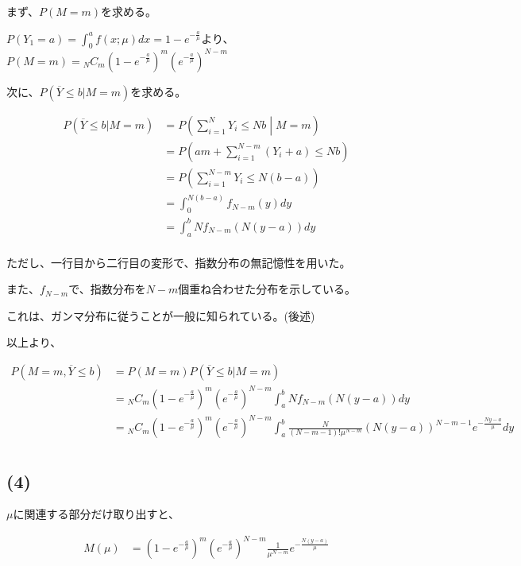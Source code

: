 \documentclass[a4paper, 10pt, dvipdfmx]{jlreq}
\begin{document}
まず、$P(M=m)$を求める。

$P(Y_1=a)=\int_0^a{f(x;\mu)}dx=1-e^{-\frac{a}{\mu}}$より、$P(M=m) = {}_NC_m (1-e^{-\frac{a}{\mu}})^m(e^{-\frac{a}{\mu}})^{N-m}$

次に、$P(\overline{Y}\leq b | M=m)$を求める。

\begin{align*}
    P(\overline{Y}\leq b | M=m) & = P\left( \sum_{i=1}^N Y_i \leq Nb \middle| M=m \right)  \\
                                & = P\left( am + \sum_{i=1}^{N-m} (Y_i+a)  \leq Nb \right) \\
                                & = P\left( \sum_{i=1}^{N-m} Y_i  \leq N(b-a) \right)      \\
                                & = \int_0^{N(b-a)} f_{N-m}(y) dy                          \\
                                & = \int_a^{b} Nf_{N-m}(N(y-a)) dy                         \\
\end{align*}

ただし、一行目から二行目の変形で、指数分布の無記憶性を用いた。

また、$f_{N-m}$で、指数分布を$N-m$個重ね合わせた分布を示している。

これは、ガンマ分布に従うことが一般に知られている。(後述)

以上より、

\begin{align*}
    P(M=m,\overline{Y}\leq b) & = P(M=m)P(\overline{Y} \leq b|M=m)                                                                                                            \\
                              & = {}_NC_m (1-e^{-\frac{a}{\mu}})^m(e^{-\frac{a}{\mu}})^{N-m} \int_a^{b} N f_{N-m}(N(y-a)) dy                                                  \\
                              & = {}_NC_m (1-e^{-\frac{a}{\mu}})^m(e^{-\frac{a}{\mu}})^{N-m} \int_a^{b} \frac{N}{(N-m-1)!\mu^{N-m}} (N(y-a))^{N-m-1} e^{-\frac{Ny-a}{\mu}} dy \\
\end{align*}

\subsection*{(4)}

$\mu$に関連する部分だけ取り出すと、

\begin{align*}
    M(\mu) & = (1-e^{-\frac{a}{\mu}})^m(e^{-\frac{a}{\mu}})^{N-m}  \frac{1}{\mu^{N-m}} e^{-\frac{N(y-a)}{\mu}}
\end{align*}
\end{document}
